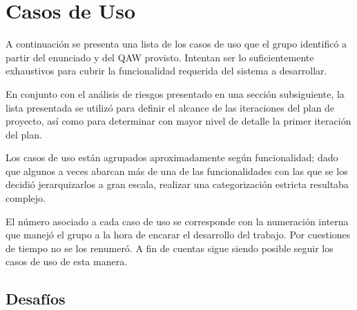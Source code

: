 \section{Casos de Uso}
\label{sec:casosdeuso}
A continuación se presenta una lista de los casos de uso que el grupo identificó a partir del enunciado y del QAW provisto. Intentan ser lo suficientemente exhaustivos para cubrir la funcionalidad requerida del sistema a desarrollar.

En conjunto con el análisis de riesgos presentado en una sección subsiguiente, la lista presentada se utilizó para definir el alcance de las iteraciones del plan de proyecto, así como para determinar con mayor nivel de detalle la primer iteración del plan.

Los casos de uso están agrupados aproximadamente según funcionalidad; dado que algunos a veces abarcan más de una de las funcionalidades con las que se los decidió jerarquizarlos a gran escala, realizar una categorización estricta resultaba complejo.

El número asociado a cada caso de uso se corresponde con la numeración interna que manejó el grupo a la hora de encarar el desarrollo del trabajo. Por cuestiones de tiempo no se los renumeró. A fin de cuentas sigue siendo posible seguir los casos de uso de esta manera.




\subsection{Desafíos}
